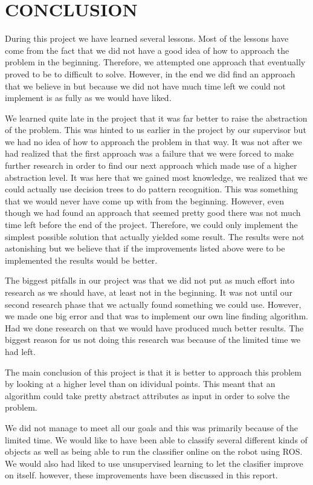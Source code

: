 \documentclass[a4paper, 10pt, conference]{ieeeconf}      %
\begin{document}
\section{CONCLUSION}
During this project we have learned several lessons. Most of the lessons have come from the fact that we did not have a good idea of how to approach the problem in the beginning. Therefore, we attempted one approach that eventually proved to be to difficult to solve. However, in the end we did find an approach that we believe in but because we did not have much time left we could not implement is as fully as we would have liked.

We learned quite late in the project that it was far better to raise the abstraction of the problem. This was hinted to us earlier in the project by our supervisor but we had no idea of how to approach the problem in that way. It was not after we had realized that the first approach was a failure that we were forced to make further research in order to find our next approach which made use of a higher abstraction level. It was here that we gained most knowledge, we realized that we could actually use decision trees to do pattern recognition. This was something that we would never have come up with from the beginning. However, even though we had found an approach that seemed pretty good there was not much time left before the end of the project. Therefore, we could only implement the simplest possible solution that actually yielded some result. The results were not astonishing but we believe that if the improvements listed above were to be implemented the results would be better.

The biggest pitfalls in our project was that we did not put as much effort into research as we should have, at least not in the beginning. It was not until our second research phase that we actually found something we could use. However, we made one big error and that was to implement our own line finding algorithm. Had we done research on that we would have produced much better results. The biggest reason for us not doing this research was because of the limited time we had left.

The main conclusion of this project is that it is better to approach this problem by looking at a higher level than on idividual points. This meant that an algorithm could take pretty abstract attributes as input in order to solve the problem.

We did not manage to meet all our goals and this was primarily because of the limited time. We would like to have been able to classify several different kinds of objects as well as being able to run the classifier online on the robot using ROS. We would also had liked to use unsupervised learning to let the clasifier improve on itself. however, these improvements have been discussed in this report.
\end{document}
